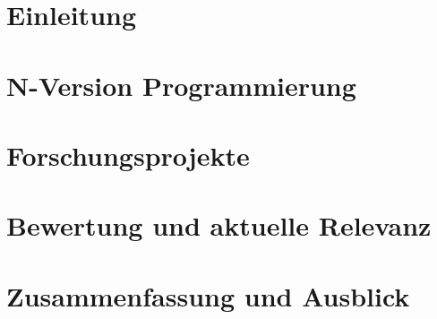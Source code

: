 \documentclass{llncs}
\begin{document}
\mainmatter  %


\tableofcontents

\cleardoublepage

\section{Einleitung} \label{einleitung}


\section{N-Version Programmierung} \label{definition}


\section{Forschungsprojekte} \label{beispiele}


\section{Bewertung und aktuelle Relevanz} \label{bewertung}


\section{Zusammenfassung und Ausblick} \label{zusammenfassung-ausblick}



\clearpage




%
\end{document}
